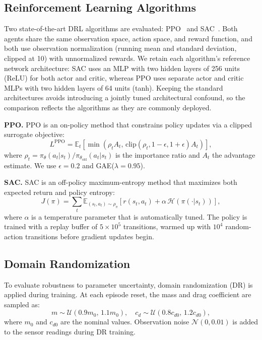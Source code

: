 \documentclass[conference]{IEEEtran}
\begin{document}
\subsection{Reinforcement Learning Algorithms}
Two state-of-the-art DRL algorithms are evaluated: PPO~\cite{schulman2017ppo} and SAC~\cite{haarnoja2018sac}. Both agents share the same observation space, action space, and reward function, and both use observation normalization (running mean and standard deviation, clipped at 10) with unnormalized rewards. We retain each algorithm's reference network architecture: SAC uses an MLP with two hidden layers of 256 units (ReLU) for both actor and critic, whereas PPO uses separate actor and critic MLPs with two hidden layers of 64 units (tanh). Keeping the standard architectures avoids introducing a jointly tuned architectural confound, so the comparison reflects the algorithms as they are commonly deployed.

\textbf{PPO.} PPO is an on-policy method that constrains policy updates via a clipped surrogate objective:
\begin{equation}
L^{\text{PPO}} = \mathbb{E}_t\!\left[\min\!\left(\rho_t A_t,\, \text{clip}(\rho_t, 1{-}\epsilon, 1{+}\epsilon) A_t\right)\right],
\end{equation}
where $\rho_t = \pi_\theta(a_t|s_t) / \pi_{\theta_{\text{old}}}(a_t|s_t)$ is the importance ratio and $A_t$ the advantage estimate. We use $\epsilon = 0.2$ and GAE($\lambda = 0.95$).

\textbf{SAC.} SAC is an off-policy maximum-entropy method that maximizes both expected return and policy entropy:
\begin{equation}
J(\pi) = \sum_t \mathbb{E}_{(s_t, a_t) \sim \rho_\pi}\!\left[r(s_t, a_t) + \alpha\, \mathcal{H}(\pi(\cdot|s_t))\right],
\end{equation}
where $\alpha$ is a temperature parameter that is automatically tuned. The policy is trained with a replay buffer of $5\times10^5$ transitions, warmed up with $10^4$ random-action transitions before gradient updates begin.

\subsection{Domain Randomization}
To evaluate robustness to parameter uncertainty, domain randomization (DR) is applied during training. At each episode reset, the mass and drag coefficient are sampled as:
\begin{equation}
m \sim \mathcal{U}(0.9 m_0,\, 1.1 m_0), \quad c_d \sim \mathcal{U}(0.8 c_{d0},\, 1.2 c_{d0}),
\end{equation}
where $m_0$ and $c_{d0}$ are the nominal values. Observation noise $\mathcal{N}(0, 0.01)$ is added to the sensor readings during DR training.
\end{document}
